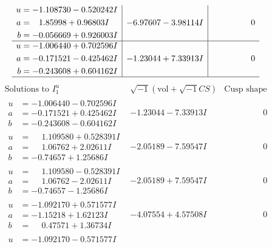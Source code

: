 \documentclass[1p]{elsarticle_modified}
\theoremstyle{definition}
\newcommand{\I}{\sqrt{-1}}
\begin{document}
$$\begin{array}{c|c|c}
\begin{aligned}
u &= -1.108730 - 0.520242 I \\
a &= \phantom{-}1.85998 + 0.96803 I \\
b &= -0.056669 + 0.926003 I\end{aligned}
 & -6.97607 - 3.98114 I & \phantom{-0.000000 } 0 \\ \hline\begin{aligned}
u &= -1.006440 + 0.702596 I \\
a &= -0.171521 - 0.425462 I \\
b &= -0.243608 + 0.604162 I\end{aligned}
 & -1.23044 + 7.33913 I & \phantom{-0.000000 } 0\\
 \hline 
 \end{array}$$\newpage$$\begin{array}{c|c|c}  
\text{Solutions to }I^u_{1}& \I (\text{vol} + \sqrt{-1}CS) & \text{Cusp shape}\\
 \hline 
\begin{aligned}
u &= -1.006440 - 0.702596 I \\
a &= -0.171521 + 0.425462 I \\
b &= -0.243608 - 0.604162 I\end{aligned}
 & -1.23044 - 7.33913 I & \phantom{-0.000000 } 0 \\ \hline\begin{aligned}
u &= \phantom{-}1.109580 + 0.528391 I \\
a &= \phantom{-}1.06762 + 2.02611 I \\
b &= -0.74657 + 1.25686 I\end{aligned}
 & -2.05189 - 7.59547 I & \phantom{-0.000000 } 0 \\ \hline\begin{aligned}
u &= \phantom{-}1.109580 - 0.528391 I \\
a &= \phantom{-}1.06762 - 2.02611 I \\
b &= -0.74657 - 1.25686 I\end{aligned}
 & -2.05189 + 7.59547 I & \phantom{-0.000000 } 0 \\ \hline\begin{aligned}
u &= -1.092170 + 0.571577 I \\
a &= -1.15218 + 1.62123 I \\
b &= \phantom{-}0.47571 + 1.36734 I\end{aligned}
 & -4.07554 + 4.57508 I & \phantom{-0.000000 } 0 \\ \hline\begin{aligned}
u &= -1.092170 - 0.571577 I \\

\end{aligned}
\end{array}$$
\end{document}

